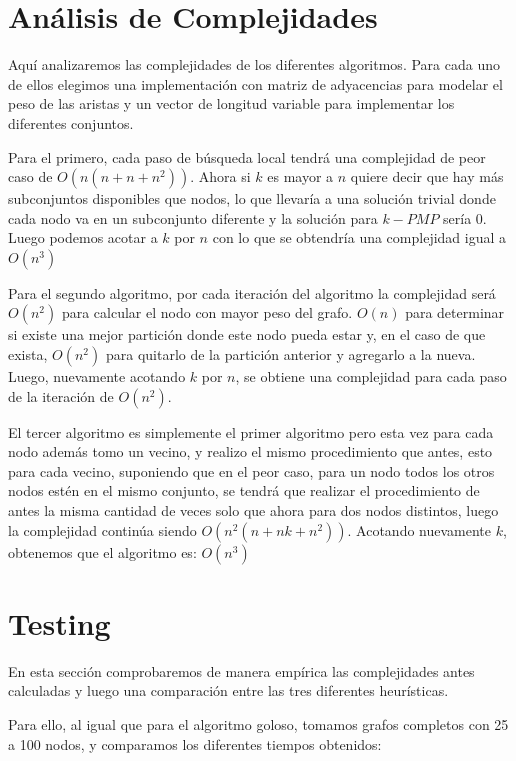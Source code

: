 \newpage

\section{Análisis de Complejidades}

Aquí analizaremos las complejidades de los diferentes algoritmos. Para cada uno de ellos elegimos una implementación con matriz de adyacencias para modelar el peso de las aristas y un vector de longitud variable para implementar los diferentes conjuntos.

Para el primero, cada paso de búsqueda local tendrá una complejidad de peor caso de $O(n(n + n + n^2))$. Ahora si $k$ es mayor a $n$ quiere decir que hay más subconjuntos disponibles que nodos, lo que llevaría a una solución trivial donde cada nodo va en un subconjunto diferente y la solución para $k-PMP$ sería 0.
Luego podemos acotar a $k$ por $n$ con lo que se obtendría una complejidad igual a $O(n^3)$

Para el segundo algoritmo, por cada iteración del algoritmo la complejidad será $O(n^2)$ para calcular el nodo con mayor peso del grafo. $O(n)$ para determinar si existe una mejor partición donde este nodo pueda estar y, en el caso de que exista, $O(n^2)$ para quitarlo de la partición anterior y agregarlo a la nueva. Luego, nuevamente acotando $k$ por $n$, se obtiene una complejidad para cada paso de la iteración de $O(n^2)$.

El tercer algoritmo es simplemente el primer algoritmo pero esta vez para cada nodo además tomo un vecino, y realizo el mismo procedimiento que antes, esto para cada vecino, suponiendo que en el peor caso, para un nodo todos los otros nodos estén en el mismo conjunto, se tendrá que realizar el procedimiento de antes la misma cantidad de veces solo que ahora para dos nodos distintos, luego la complejidad continúa siendo $O(n^2 (n + n k + n^2))$. Acotando nuevamente $k$, obtenemos que el algoritmo es: $O(n^3)$

\section{Testing}

En esta sección comprobaremos de manera empírica las complejidades antes calculadas y luego una comparación entre las tres diferentes heurísticas.

Para ello, al igual que para el algoritmo goloso, tomamos grafos completos con 25 a 100 nodos, y comparamos los diferentes tiempos obtenidos:

